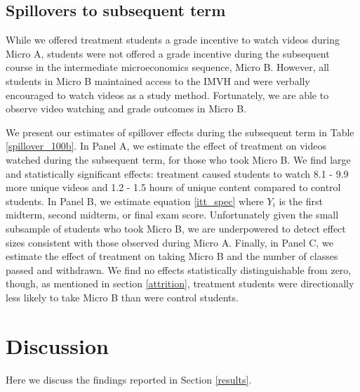 \documentclass[12pt]{article}
\begin{document}
\subsection{Spillovers to subsequent term}

While we offered treatment students a grade incentive to watch videos during Micro A, students were not offered a grade incentive during the subsequent course in the intermediate microeconomics sequence, Micro B. However, all students in Micro B maintained access to the IMVH and were verbally encouraged to watch videos as a study method. Fortunately, we are able to observe video watching and grade outcomes in Micro B.

We present our estimates of spillover effects during the subsequent term in Table \ref{spillover_100b}. In Panel A, we estimate the effect of treatment on videos watched during the subsequent term, for those who took Micro B. We find large and statistically significant effects: treatment caused students to watch 8.1 - 9.9 more unique videos and 1.2 - 1.5 hours of unique content compared to control students. In Panel B, we estimate equation \ref{itt_spec} where $Y_i$ is the first midterm, second midterm, or final exam score. Unfortunately given the small subsample of students who took Micro B, we are underpowered to detect effect sizes consistent with those observed during Micro A. Finally, in Panel C, we estimate the effect of treatment on taking Micro B and the number of classes passed and withdrawn. We find no effects statistically distinguishable from zero, though, as mentioned in section \ref{attrition}, treatment students were directionally less likely to take Micro B than were control students.


\section{Discussion} \label{discussion}

Here we discuss the findings reported in Section \ref{results}.
\end{document}

